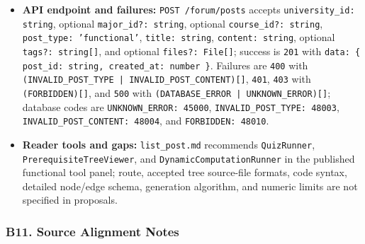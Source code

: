 \documentclass[12pt]{article}
\begin{document}
\begin{itemize}
\item \textbf{API endpoint and failures:} \texttt{POST /forum/posts} accepts \texttt{university\_id: string}, optional \texttt{major\_id?: string}, optional \texttt{course\_id?: string}, \texttt{post\_type: 'functional'}, \texttt{title: string}, \texttt{content: string}, optional \texttt{tags?: string[]}, and optional \texttt{files?: File[]}; success is \texttt{201} with \texttt{data: \{ post\_id: string, created\_at: number \}}. Failures are \texttt{400} with \texttt{(INVALID\_POST\_TYPE | INVALID\_POST\_CONTENT)[]}, \texttt{401}, \texttt{403} with \texttt{(FORBIDDEN)[]}, and \texttt{500} with \texttt{(DATABASE\_ERROR | UNKNOWN\_ERROR)[]}; database codes are \texttt{UNKNOWN\_ERROR: 45000}, \texttt{INVALID\_POST\_TYPE: 48003}, \texttt{INVALID\_POST\_CONTENT: 48004}, and \texttt{FORBIDDEN: 48010}.
\item \textbf{Reader tools and gaps:} \texttt{list\_post.md} recommends \texttt{QuizRunner}, \texttt{PrerequisiteTreeViewer}, and \texttt{DynamicComputationRunner} in the published functional tool panel; route, accepted tree source-file formats, code syntax, detailed node/edge schema, generation algorithm, and numeric limits are not specified in proposals.
\end{itemize}
\par\medskip

\hypertarget{sec:b11-source-alignment-notes}{}
\subsubsection*{B11. Source Alignment Notes}
\par\medskip
\end{document}
